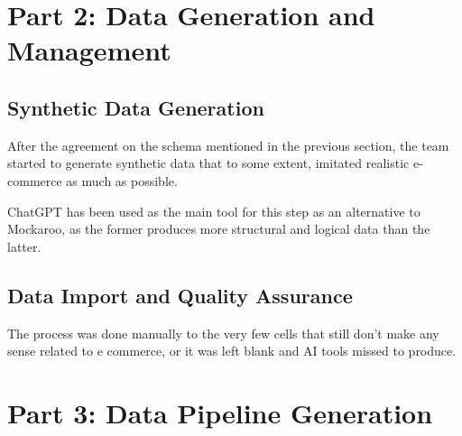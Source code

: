 \documentclass[
]{article}
\begin{document}
\hypertarget{part-2-data-generation-and-management}{%
\section{Part 2: Data Generation and
Management}\label{part-2-data-generation-and-management}}

\hypertarget{synthetic-data-generation}{%
\subsection{Synthetic Data Generation}\label{synthetic-data-generation}}

After the agreement on the schema mentioned in the previous section, the
team started to generate synthetic data that to some extent, imitated
realistic e-commerce as much as possible.

ChatGPT has been used as the main tool for this step as an alternative
to Mockaroo, as the former produces more structural and logical data
than the latter.

\hypertarget{data-import-and-quality-assurance}{%
\subsection{Data Import and Quality
Assurance}\label{data-import-and-quality-assurance}}

The process was done manually to the very few cells that still don't
make any sense related to e commerce, or it was left blank and AI tools
missed to produce.

\hypertarget{part-3-data-pipeline-generation}{%
\section{Part 3: Data Pipeline
Generation}\label{part-3-data-pipeline-generation}}
\end{document}
